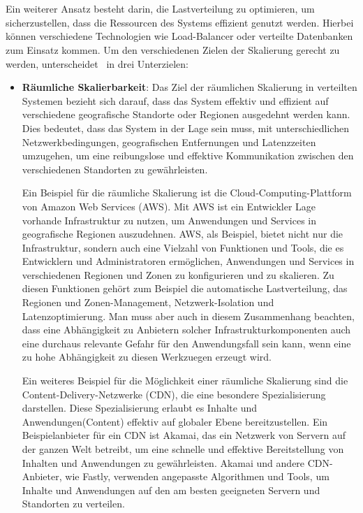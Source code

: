 \documentclass[../vs-script-first-v01.tex]{subfiles}
\begin{document}
\\\\
Ein weiterer Ansatz besteht darin, die Lastverteilung zu optimieren, um sicherzustellen, dass die Ressourcen des Systems effizient genutzt werden. Hierbei können verschiedene Technologien wie Load-Balancer oder verteilte Datenbanken zum Einsatz kommen. Um den verschiedenen Zielen der Skalierung gerecht zu werden, unterscheidet~\cite{tanenbaum2017distributed} in drei Unterzielen:
\begin{itemize}
  \item \textbf{Räumliche Skalierbarkeit}: Das Ziel der räumlichen Skalierung in verteilten Systemen bezieht sich darauf, dass das System effektiv und effizient auf verschiedene geografische Standorte oder Regionen ausgedehnt werden kann. Dies bedeutet, dass das System in der Lage sein muss, mit unterschiedlichen Netzwerkbedingungen, geografischen Entfernungen und Latenzzeiten umzugehen, um eine reibungslose und effektive Kommunikation zwischen den verschiedenen Standorten zu gewährleisten.

        Ein Beispiel für die räumliche Skalierung ist die Cloud-Computing-Plattform von Amazon Web Services (AWS). Mit AWS ist ein Entwickler Lage vorhande Infrastruktur zu nutzen, um Anwendungen und Services in geografische Regionen auszudehnen. AWS, als Beispiel, bietet nicht nur die Infrastruktur, sondern auch eine Vielzahl von Funktionen und Tools, die es Entwicklern und Administratoren ermöglichen, Anwendungen und Services in verschiedenen Regionen und Zonen zu konfigurieren und zu skalieren. Zu diesen Funktionen gehört zum Beispiel die automatische Lastverteilung, das Regionen und Zonen-Management, Netzwerk-Isolation und Latenzoptimierung. Man muss aber auch in diesem Zusammenhang beachten, dass eine Abhängigkeit zu Anbietern solcher Infrastrukturkomponenten auch eine durchaus relevante Gefahr für den Anwendungsfall sein kann, wenn eine zu hohe Abhängigkeit zu diesen Werkzuegen erzeugt wird.

        Ein weiteres Beispiel für die Möglichkeit einer räumliche Skalierung sind die Content-Delivery-Netzwerke (CDN), die eine besondere Spezialisierung darstellen. Diese Spezialisierung erlaubt es Inhalte und Anwendungen(Content) effektiv auf globaler Ebene bereitzustellen. Ein Beispielanbieter für ein CDN ist Akamai, das ein Netzwerk von Servern auf der ganzen Welt betreibt, um eine schnelle und effektive Bereitstellung von Inhalten und Anwendungen zu gewährleisten. Akamai und andere CDN-Anbieter, wie Fastly, verwenden angepasste Algorithmen und Tools, um Inhalte und Anwendungen auf den am besten geeigneten Servern und Standorten zu verteilen.


\end{itemize}
\end{document}
